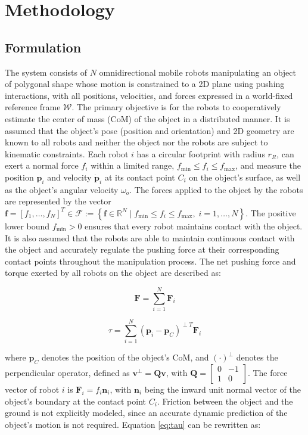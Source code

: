 \section{Methodology}
\label{sec:method}

\subsection{Formulation}

The system consists of $N$ omnidirectional mobile robots manipulating an object of polygonal shape whose motion is constrained to a 2D plane using pushing interactions, with all positions, velocities, and forces expressed in a world-fixed reference frame $\mathcal{W}$. The primary objective is for the robots to cooperatively estimate the center of mass (CoM) of the object in a distributed manner. It is assumed that the object's pose (position and orientation) and 2D geometry are known to all robots and neither the object nor the robots are subject to kinematic constraints. Each robot $i$ has a circular footprint with radius $r_R$, can exert a normal force $f_i$ within a limited range, $f_{\min} \leq f_i \leq f_{\max}$, and measure the position $\mathbf{p}_i$ and velocity $\dot{\mathbf{p}}_i$ at its contact point $C_i$ on the object's surface, as well as the object's angular velocity $\omega_o$. The forces applied to the object by the robots are represented by the vector
$
\mathbf{f}=[f_1,\ldots,f_N]^T \in
\mathcal{F}
:=
\left\{
\mathbf{f}\in\mathbb{R}^N
\mid
f_{\min}\leq f_i\leq f_{\max},
\; i=1,\ldots,N
\right\}.
$
The positive lower bound $f_{\min}>0$ ensures that every robot maintains contact with the object. It is also assumed that the robots are able to maintain continuous contact with the object and accurately regulate the pushing force at their corresponding contact points throughout the manipulation process. The net pushing force and torque exerted by all robots on the object are described as:

\begin{equation}
\mathbf{F}
=
\sum_{i=1}^{N}
\mathbf{F}_{i}
\label{eq:force}
\end{equation}

\begin{equation}
\tau
=
\sum_{i=1}^{N}
\left(
\mathbf{p}_{i}-\mathbf{p}_{C}
\right)^{\perp T}
\mathbf{F}_{i}
\label{eq:tau}
\end{equation}

where $\mathbf{p}_C$ denotes the position of the object's CoM, and $(\cdot)^\perp$ denotes the perpendicular operator, defined as
$\mathbf{v}^\perp = \mathbf{Q}\mathbf{v}$, with
$\mathbf{Q}=\begin{bmatrix}0&-1\\1&0\end{bmatrix}$. The force vector of robot $i$ is $\mathbf{F}_i=f_i\mathbf{n}_i$, with $\mathbf{n}_i$ being the inward unit normal vector of the object's boundary at the contact point $C_i$. Friction between the object and the ground is not explicitly modeled, since an accurate dynamic prediction of the object's motion is not required. Equation \eqref{eq:tau} can be rewritten as:


